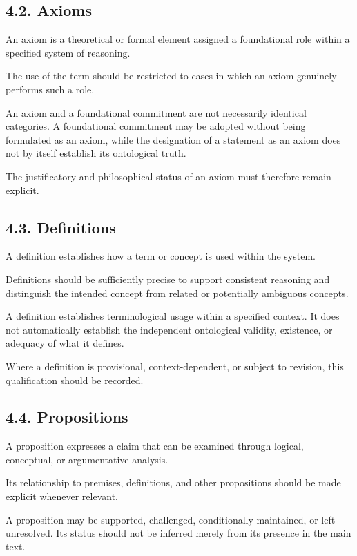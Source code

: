 \subsection*{4.2. Axioms}

An axiom is a theoretical or formal element
assigned a foundational role within a specified
system of reasoning.

The use of the term should be restricted to
cases in which an axiom genuinely performs
such a role.

An axiom and a foundational commitment are
not necessarily identical categories. A
foundational commitment may be adopted without
being formulated as an axiom, while the
designation of a statement as an axiom does
not by itself establish its ontological truth.

The justificatory and philosophical status
of an axiom must therefore remain explicit.

\subsection*{4.3. Definitions}

A definition establishes how a term or concept
is used within the system.

Definitions should be sufficiently precise
to support consistent reasoning and distinguish
the intended concept from related or potentially
ambiguous concepts.

A definition establishes terminological usage
within a specified context. It does not
automatically establish the independent
ontological validity, existence, or adequacy
of what it defines.

Where a definition is provisional, context-dependent,
or subject to revision, this qualification
should be recorded.

\subsection*{4.4. Propositions}

A proposition expresses a claim that can be
examined through logical, conceptual, or
argumentative analysis.

Its relationship to premises, definitions,
and other propositions should be made explicit
whenever relevant.

A proposition may be supported, challenged,
conditionally maintained, or left unresolved.
Its status should not be inferred merely from
its presence in the main text.


